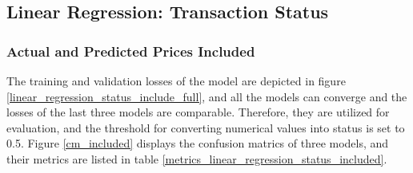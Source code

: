 \documentclass[12pt,twoside]{report}
\begin{document}
\subsection{Linear Regression: Transaction Status}
\label{linear_regression_status}
\subsubsection{Actual and Predicted Prices Included}
The training and validation losses of the model are depicted in figure \ref{linear_regression_status_include_full}, and all the models can converge and the losses of the last three models are comparable. Therefore, they are utilized for evaluation, and the threshold for converting numerical values into status is set to 0.5. Figure \ref{cm_included} displays the confusion matrics of three models, and their metrics are listed in table \ref{metrics_linear_regression_status_included}.
\\
\end{document}
